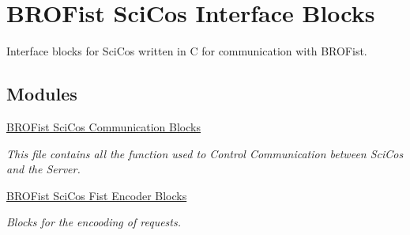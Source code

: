 \hypertarget{group___b_r_o_sci_cos}{
\section{BROFist SciCos Interface Blocks}
\label{group___b_r_o_sci_cos}
}


Interface blocks for SciCos written in C for communication with BROFist.  


\subsection*{Modules}
\begin{DoxyCompactItemize}
\item 
\hyperlink{group___b_r_o_cos_comm}{BROFist SciCos Communication Blocks}


\begin{DoxyCompactList}\small\item\em This file contains all the function used to Control Communication between SciCos and the Server. \item\end{DoxyCompactList}

\item 
\hyperlink{group___b_r_o_cos_enc}{BROFist SciCos Fist Encoder Blocks}


\begin{DoxyCompactList}\small\item\em Blocks for the encooding of requests. \item\end{DoxyCompactList}

\end{DoxyCompactItemize}


